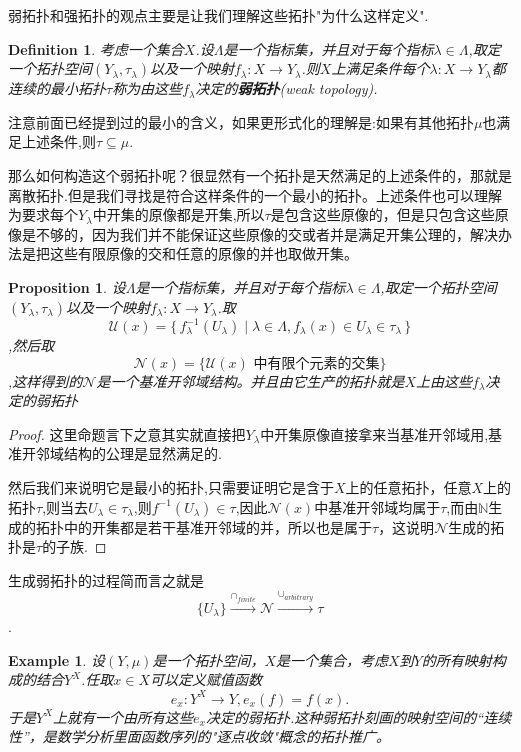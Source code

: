 \documentclass{article}
\newtheorem{proposition}[theorem]{Proposition}
\newtheorem{example}[theorem]{Example}
\newtheorem{definition}[theorem]{Definition}
\newcommand*{\xfunc}[4]{{#2}\colon{#3}{#1}{#4}}
\newcommand*{\func}[3]{\xfunc{\to}{#1}{#2}{#3}}
\newcommand\Set[2]{\{\,#1\mid#2\,\}} %
\begin{document}
弱拓扑和强拓扑的观点主要是让我们理解这些拓扑"为什么这样定义".


\begin{definition}
考虑一个集合$X$.设$\Lambda$是一个指标集，并且对于每个指标$\lambda \in \Lambda$,取定一个拓扑空间$(Y_\lambda,\tau_\lambda)$以及一个映射$\func{f_\lambda}{X}{Y_\lambda}$.则$X$上满足条件每个$\func{\lambda}{X}{Y_\lambda}$都连续的最小拓扑$\tau$称为由这些$f_\lambda$决定的\textbf{弱拓扑}(weak topology).
\end{definition}

注意前面已经提到过的最小的含义，如果更形式化的理解是:如果有其他拓扑$\mu$也满足上述条件,则$\tau \subseteq \mu$.

那么如何构造这个弱拓扑呢？很显然有一个拓扑是天然满足的上述条件的，那就是离散拓扑.但是我们寻找是符合这样条件的一个最小的拓扑。上述条件也可以理解为要求每个$Y_\lambda$中开集的原像都是开集,所以$\tau$是包含这些原像的，但是只包含这些原像是不够的，因为我们并不能保证这些原像的交或者并是满足开集公理的，解决办法是把这些有限原像的交和任意的原像的并也取做开集。

\begin{proposition}
设$\Lambda$是一个指标集，并且对于每个指标$\lambda \in \Lambda$,取定一个拓扑空间$(Y_\lambda,\tau_\lambda)$以及一个映射$\func{f_\lambda}{X}{Y_\lambda}$.取 \[\mathcal{U}(x)=\Set{f_{\lambda}^{-1}(U_\lambda)}{\lambda \in \Lambda,f_\lambda(x) \in U_\lambda \in \tau_\lambda}\],然后取\[\mathcal{N}(x)=\{\mathcal{U}(x)\text{ 中有限个元素的交集}\}\],这样得到的$\mathcal{N}$是一个基准开邻域结构。并且由它生产的拓扑就是$X$上由这些$f_\lambda$决定的弱拓扑
\end{proposition}

\begin{proof}
这里命题言下之意其实就直接把$Y_\lambda$中开集原像直接拿来当基准开邻域用,基准开邻域结构的公理是显然满足的.

然后我们来说明它是最小的拓扑,只需要证明它是含于$X$上的任意拓扑，任意$X$上的拓扑$\tau$,则当去$U_\lambda \in \tau_\lambda$,则$f^{-1}(U_\lambda) \in \tau$,因此$\mathcal{N}(x)$中基准开邻域均属于$\tau$,而由$\mathbb{N}$生成的拓扑中的开集都是若干基准开邻域的并，所以也是属于$\tau$，这说明$\mathcal{N}$生成的拓扑是$\tau$的子族.
\end{proof}

生成弱拓扑的过程简而言之就是\[\{U_\lambda\}\stackrel{\cap_{finite}}\longrightarrow \mathcal{N}\stackrel{\cup_{arbitrary}}\longrightarrow \tau\].


\begin{example}
设$(Y,\mu)$是一个拓扑空间，$X$是一个集合，考虑$X$到$Y$的所有映射构成的结合$Y^X$.任取$x \in X$可以定义赋值函数\[\func{e_x}{Y^{X}}{Y}, e_x(f)=f(x).\]于是$Y^{X}$上就有一个由所有这些$e_x$决定的弱拓扑.这种弱拓扑刻画的映射空间的“连续性”，是数学分析里面函数序列的"逐点收敛"概念的拓扑推广。
\end{example}
\end{document}
